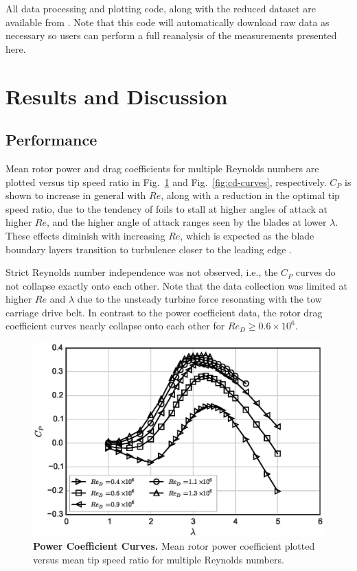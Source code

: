 \documentclass[10pt,letterpaper]{article}
\begin{document}
All data processing and plotting code, along with the reduced dataset are
available from \cite{Bachant2015-RM2-data}. Note that this code will
automatically download raw data as necessary so users can perform a full
reanalysis of the measurements presented here.


\section*{Results and Discussion}

\subsection*{Performance}

Mean rotor power and drag coefficients for multiple Reynolds numbers are plotted
versus tip speed ratio in Fig.~\ref{fig:cp-curves} and Fig.~\ref{fig:cd-curves},
respectively. $C_P$ is shown to increase in general with $Re$, along with a
reduction in the optimal tip speed ratio, due to the tendency of foils to stall
at higher angles of attack at higher $Re$, and the higher angle of attack ranges
seen by the blades at lower $\lambda$. These effects diminish with increasing
$Re$, which is expected as the blade boundary layers transition to turbulence
closer to the leading edge \cite{Lissaman1983, Bachant2015-RVAT-Re-dep}.

Strict Reynolds number independence was not observed, i.e., the $C_P$ curves do
not collapse exactly onto each other. Note that the data collection was limited
at higher $Re$ and $\lambda$ due to the unsteady turbine force resonating with
the tow carriage drive belt. In contrast to the power coefficient data, the
rotor drag coefficient curves nearly collapse onto each other for $Re_D \ge 0.6
\times 10^6$.

\begin{figure}[h]
    \includegraphics[width=\textwidth]{figures/cp_curves.eps}

    \caption{{\bf Power Coefficient Curves.} Mean rotor power coefficient
    plotted versus mean tip speed ratio for multiple Reynolds numbers.}

    \label{fig:cp-curves}
\end{figure}
\end{document}
